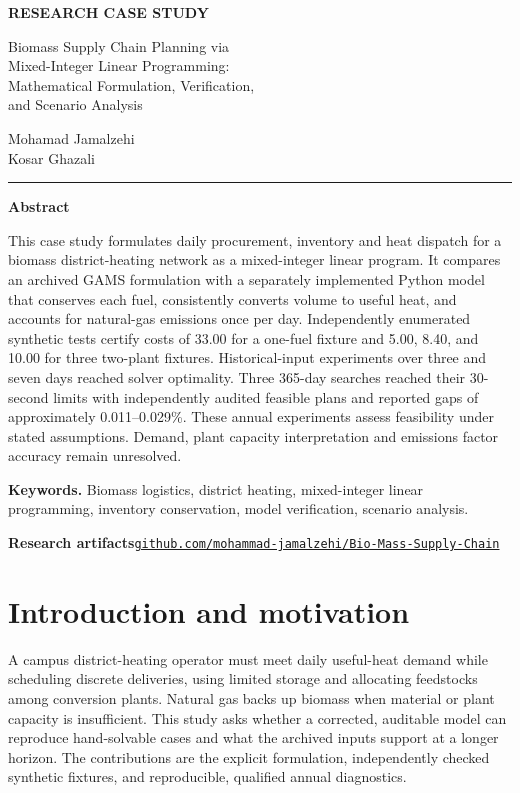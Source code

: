 \documentclass[11pt,a4paper]{article}
\newcommand{\repo}{https://github.com/mohammad-jamalzehi/Bio-Mass-Supply-Chain}
\begin{document}
\hypersetup{pageanchor=false}
\begin{titlepage}
\thispagestyle{empty}
\vspace*{12mm}
{\color{accent}\large\bfseries RESEARCH CASE STUDY\par}
\vspace{8mm}
{\color{ink}\LARGE\bfseries\raggedright
Biomass Supply Chain Planning via\\
Mixed-Integer Linear Programming:\\
Mathematical Formulation, Verification,\\
and Scenario Analysis\par}
\vspace{7mm}
{\large Mohamad Jamalzehi \\[2pt] Kosar Ghazali\par}
\vspace{12mm}
{\color{accent}\rule{\textwidth}{1pt}}
\vspace{4mm}
{\large\bfseries Abstract\par}
This case study formulates daily procurement, inventory and heat dispatch for
a biomass district-heating network as a mixed-integer linear program. It
compares an archived GAMS formulation with a separately implemented Python
model that conserves each fuel, consistently converts volume to useful heat,
and accounts for natural-gas emissions once per day. Independently enumerated
synthetic tests certify costs of 33.00 for a one-fuel fixture and 5.00, 8.40, and
10.00 for three two-plant fixtures. Historical-input experiments over three and
seven days reached solver optimality. Three 365-day searches reached their
30-second limits with independently audited feasible plans and reported gaps
of approximately 0.011--0.029\%. These annual experiments assess feasibility
under stated assumptions. Demand, plant capacity interpretation and emissions
factor accuracy remain unresolved.
\vspace{6mm}

\textbf{Keywords.} Biomass logistics, district heating, mixed-integer linear
programming, inventory conservation, model verification, scenario analysis.

\vfill
{\small\textbf{Research artifacts}\quad \href{\repo}{\nolinkurl{github.com/mohammad-jamalzehi/Bio-Mass-Supply-Chain}}\par}
\end{titlepage}
\hypersetup{pageanchor=true}

\section{Introduction and motivation}
A campus district-heating operator must meet daily useful-heat demand while
scheduling discrete deliveries, using limited storage and allocating feedstocks
among conversion plants. Natural gas backs up biomass when material or plant
capacity is insufficient. This study asks whether a corrected, auditable model
can reproduce hand-solvable cases and what the archived inputs support at a
longer horizon. The contributions are the explicit formulation, independently
checked synthetic fixtures, and reproducible, qualified annual diagnostics.
\end{document}
